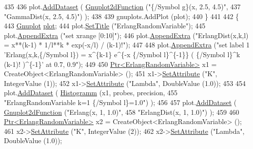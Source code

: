 \begin{DoxyCode}
435 
436     plot.\hyperlink{classns3_1_1Gnuplot_a306ec724a327cf9ab699700f31fca0a1}{AddDataset} ( \hyperlink{classns3_1_1Gnuplot2dFunction}{Gnuplot2dFunction} (\textcolor{stringliteral}{"\{/Symbol g\}(x, 2.5, 4.5)"},
437                                          \textcolor{stringliteral}{"GammaDist(x, 2.5, 4.5)"}) );
438 
439     gnuplots.AddPlot (plot);
440   \}
441 
442   \{
443     \hyperlink{classns3_1_1Gnuplot}{Gnuplot} \hyperlink{lte__amc_8m_a5942306abe9f005572e4344e3cdef528}{plot};
444     plot.\hyperlink{classns3_1_1Gnuplot_ac01f15633d49f0239f8a45293a1e04f0}{SetTitle} (\textcolor{stringliteral}{"ErlangRandomVariable"});
445     plot.\hyperlink{classns3_1_1Gnuplot_a649a3041b9d0ea21a212b5ad9b28ecbf}{AppendExtra} (\textcolor{stringliteral}{"set xrange [0:10]"});
446     plot.\hyperlink{classns3_1_1Gnuplot_a649a3041b9d0ea21a212b5ad9b28ecbf}{AppendExtra} (\textcolor{stringliteral}{"ErlangDist(x,k,l) = x**(k-1) * 1/l**k * exp(-x/l) / (k-1)!"});
447 
448     plot.\hyperlink{classns3_1_1Gnuplot_a649a3041b9d0ea21a212b5ad9b28ecbf}{AppendExtra} (\textcolor{stringliteral}{"set label 1 'Erlang(x,k,\{/Symbol l\}) = x^\{k-1\} e^\{-x \{/Symbol l\}^\{-1\}\} (
       \{/Symbol l\}^k (k-1)! )^\{-1\}' at 0.7, 0.9"});
449 
450     \hyperlink{classns3_1_1Ptr}{Ptr<ErlangRandomVariable>} x1 = CreateObject<ErlangRandomVariable> ();
451     x1->\hyperlink{classns3_1_1ObjectBase_ac60245d3ea4123bbc9b1d391f1f6592f}{SetAttribute} (\textcolor{stringliteral}{"K"}, IntegerValue (1));
452     x1->\hyperlink{classns3_1_1ObjectBase_ac60245d3ea4123bbc9b1d391f1f6592f}{SetAttribute} (\textcolor{stringliteral}{"Lambda"}, DoubleValue (1.0));
453 
454     plot.\hyperlink{classns3_1_1Gnuplot_a306ec724a327cf9ab699700f31fca0a1}{AddDataset} ( \hyperlink{main-random-variable_8cc_a2cfd3837ab3f2e816cf53486d7a186b5}{Histogramm} (x1, probes, precision,
455                                   \textcolor{stringliteral}{"ErlangRandomVariable k=1 \{/Symbol l\}=1.0"}) );
456 
457     plot.\hyperlink{classns3_1_1Gnuplot_a306ec724a327cf9ab699700f31fca0a1}{AddDataset} ( \hyperlink{classns3_1_1Gnuplot2dFunction}{Gnuplot2dFunction} (\textcolor{stringliteral}{"Erlang(x, 1, 1.0)"},
458                                          \textcolor{stringliteral}{"ErlangDist(x, 1, 1.0)"}) );
459 
460     \hyperlink{classns3_1_1Ptr}{Ptr<ErlangRandomVariable>} x2 = CreateObject<ErlangRandomVariable> ();
461     x2->\hyperlink{classns3_1_1ObjectBase_ac60245d3ea4123bbc9b1d391f1f6592f}{SetAttribute} (\textcolor{stringliteral}{"K"}, IntegerValue (2));
462     x2->\hyperlink{classns3_1_1ObjectBase_ac60245d3ea4123bbc9b1d391f1f6592f}{SetAttribute} (\textcolor{stringliteral}{"Lambda"}, DoubleValue (1.0));

\end{DoxyCode}
